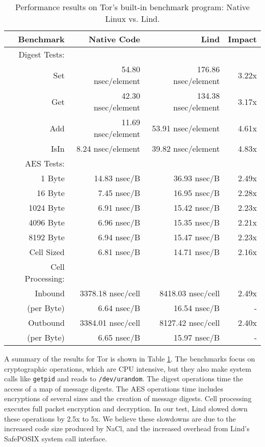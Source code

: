 {{{\begin{table}
\centering
\scriptsize
\begin{tabular}{|r|r|r|r|}
  \hline
  {\bf Benchmark} & {\bf Native Code} & {\bf Lind} & {\bf Impact}  \\
  \hline
  Digest Tests: & & & \\
  Set & 54.80 nsec/element & 176.86 nsec/element & 3.22x \\
  Get & 42.30 nsec/element & 134.38 nsec/element & 3.17x \\
  Add & 11.69 nsec/element & 53.91 nsec/element & 4.61x \\
  IsIn & 8.24 nsec/element & 39.82 nsec/element & 4.83x \\
  \hline
  AES Tests: & & & \\
  1 Byte & 14.83 nsec/B & 36.93 nsec/B & 2.49x \\
  16 Byte & 7.45 nsec/B & 16.95 nsec/B & 2.28x \\
  1024 Byte & 6.91 nsec/B & 15.42 nsec/B & 2.23x \\
  4096 Byte & 6.96 nsec/B & 15.35 nsec/B & 2.21x \\
  8192 Byte & 6.94 nsec/B & 15.47 nsec/B & 2.23x \\
  Cell Sized & 6.81 nsec/B & 14.71 nsec/B & 2.16x \\
  \hline
  Cell Processing: & & & \\
  Inbound & 3378.18 nsec/cell & 8418.03 nsec/cell & 2.49x \\
  (per Byte) & 6.64 nsec/B & 16.54 nsec/B & - \\
  Outbound & 3384.01 nsec/cell & 8127.42 nsec/cell & 2.40x \\
  (per Byte) & 6.65 nsec/B & 15.97 nsec/B & - \\
  \hline
\end{tabular}
\caption{\small Performance results on Tor's built-in benchmark program: Native
Linux vs. Lind.}
\label{table:performance_tor}
\end{table}

A summary of the results for Tor is shown in Table \ref{table:performance_tor}. The
benchmarks focus on cryptographic operations,
which are CPU intensive, but they also make system calls like \texttt{getpid} and reads to
\texttt{/dev/urandom}.
The digest operations time the access of a map of message digests.
The AES operations time includes encryptions of several sizes and the creation of
message digests. Cell processing executes full packet encryption and decryption. In our
test, Lind slowed down these operations by 2.5x to 5x. We believe these
slowdowns are due to the increased code size produced by NaCl,
and the increased overhead from Lind's SafePOSIX system call interface.

}}}
